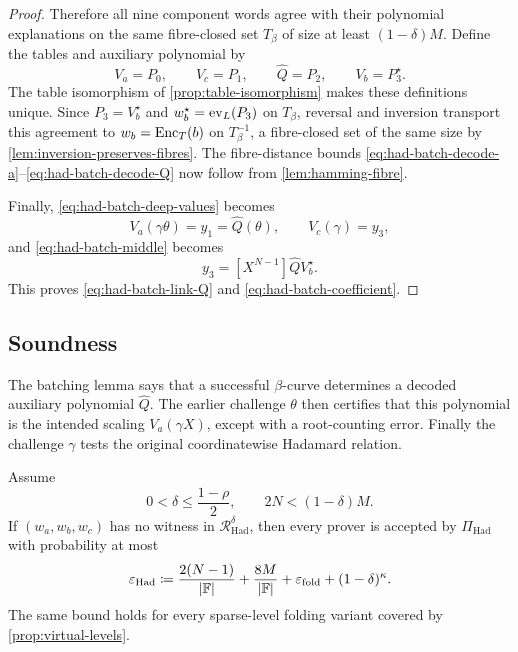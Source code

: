 \begin{proof}
Therefore all nine component words agree with their polynomial explanations on the same fibre-closed set $T_\beta$ of size at least $(1-\delta)M$.  Define the tables and auxiliary polynomial by
\[
  V_a=P_0,
  \qquad
  V_c=P_1,
  \qquad
  \widehat Q=P_2,
  \qquad
  V_b=P_3^{\star}.
\]
The table isomorphism of \cref{prop:table-isomorphism} makes these definitions unique.  Since $P_3=V_b^{\star}$ and $w_b^{\star}=\operatorname{ev}_L(P_3)$ on $T_\beta$, reversal and inversion transport this agreement to $w_b=\operatorname{Enc}_T(b)$ on $T_\beta^{-1}$, a fibre-closed set of the same size by \cref{lem:inversion-preserves-fibres}.  The fibre-distance bounds \eqref{eq:had-batch-decode-a}--\eqref{eq:had-batch-decode-Q} now follow from \cref{lem:hamming-fibre}.

Finally, \eqref{eq:had-batch-deep-values} becomes
\[
  V_a(\gamma\theta)=y_1=\widehat Q(\theta),
  \qquad
  V_c(\gamma)=y_3,
\]
and \eqref{eq:had-batch-middle} becomes
\[
  y_3=[X^{N-1}]\widehat QV_b^{\star}.
\]
This proves \eqref{eq:had-batch-link-Q} and \eqref{eq:had-batch-coefficient}.
\end{proof}

\subsection{Soundness}
\label{sec:hadamard-soundness}

The batching lemma says that a successful $\beta$-curve determines a decoded auxiliary polynomial $\widehat Q$.  The earlier challenge $\theta$ then certifies that this polynomial is the intended scaling $V_a(\gamma X)$, except with a root-counting error.  Finally the challenge $\gamma$ tests the original coordinatewise Hadamard relation.

\begin{theorem}
\label{thm:had-soundness}
Assume
\[
  0<\delta\le\frac{1-\rho}{2},
  \qquad
  2N<(1-\delta)M.
\]
If $(w_a,w_b,w_c)$ has no witness in $\mathcal R^{\delta}_{\mathrm{Had}}$, then every prover is accepted by $\Pi_{\mathrm{Had}}$ with probability at most
\begin{equation}
  \varepsilon_{\mathrm{Had}}
  \coloneqq
  \frac{2(N-1)}{|\mathbb{F}|}
  +\frac{8M}{|\mathbb{F}|}
  +\varepsilon_{\mathrm{fold}}
  +(1-\delta)^\kappa.
  \label{eq:had-soundness-bound}
\end{equation}
The same bound holds for every sparse-level folding variant covered by \cref{prop:virtual-levels}.
\end{theorem}

